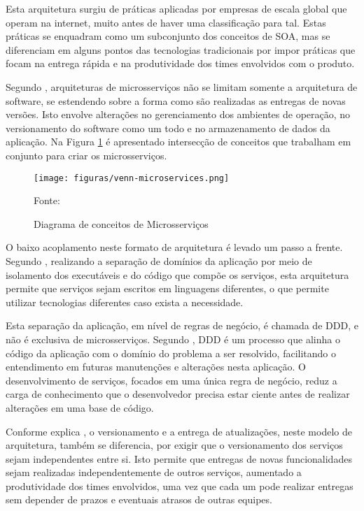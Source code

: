 Esta arquitetura surgiu de práticas aplicadas por empresas de escala global que
operam na internet, muito antes de haver uma classificação para tal. Estas
práticas se enquadram como um subconjunto dos conceitos de \ac{SOA}, mas se
diferenciam em alguns pontos das tecnologias tradicionais por impor práticas
que focam na entrega rápida e na produtividade dos times envolvidos com
o produto.

Segundo , arquiteturas de microsserviços não se limitam
somente a arquitetura de software, se estendendo sobre a forma como são
realizadas as entregas de novas versões. Isto envolve alterações no
gerenciamento dos ambientes de operação, no versionamento do software como um
todo e no armazenamento de dados da aplicação. Na Figura
\ref{fig:venn-microservices} é apresentado intersecção de conceitos que
trabalham em conjunto para criar os microsserviços.

\begin{figure}[H]
	\centering
	\caption{Diagrama de conceitos de Microsserviços}
	\texttt{[image: figuras/venn-microservices.png]}

	\label{fig:venn-microservices}
	\footnotesize Fonte: 
\end{figure}

O baixo acoplamento neste formato de arquitetura é levado um passo a frente.
Segundo , realizando a separação de domínios da
aplicação por meio de isolamento dos executáveis e do código que compõe os
serviços, esta arquitetura permite que serviços sejam escritos em linguagens
diferentes, o que permite utilizar tecnologias diferentes caso exista
a necessidade.

Esta separação da aplicação, em nível de regras de negócio, é chamada
de \ac{DDD}, e não é exclusiva de microsserviços. Segundo
, \ac{DDD} é um processo que alinha o
código da aplicação com o domínio do problema a ser resolvido,
facilitando o entendimento em futuras manutenções e alterações nesta
aplicação. O desenvolvimento de serviços, focados em uma única regra de
negócio, reduz a carga de conhecimento que o desenvolvedor precisa estar
ciente antes de realizar alterações em uma base de código.

Conforme explica , o versionamento e a entrega de
atualizações, neste modelo de arquitetura, também se diferencia, por exigir
que o versionamento dos serviços sejam independentes entre si. Isto permite
que entregas de novas funcionalidades sejam realizadas independentemente de
outros serviços, aumentado a produtividade dos times envolvidos, uma vez que
cada um pode realizar entregas sem depender de prazos e eventuais atrasos
de outras equipes.

